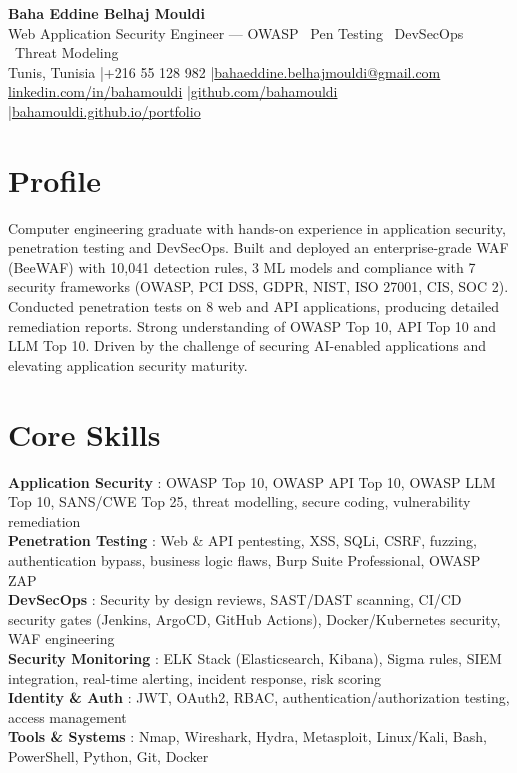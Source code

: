 \documentclass[a4paper,9pt]{article}
\begin{document}
\begin{center}
{\LARGE\bfseries\color{navy} Baha Eddine Belhaj Mouldi}\\[2pt]
{\normalsize\color{navy} Web Application Security Engineer --- OWASP \textbar\ Pen Testing \textbar\ DevSecOps \textbar\ Threat Modeling}\\[3pt]
{\small Tunis, Tunisia \quad|\quad +216 55 128 982 \quad|\quad \href{mailto:bahaeddine.belhajmouldi@gmail.com}{bahaeddine.belhajmouldi@gmail.com}}\\[1pt]
{\small \href{https://www.linkedin.com/in/bahamouldi}{linkedin.com/in/bahamouldi} \quad|\quad \href{https://github.com/bahamouldi}{github.com/bahamouldi} \quad|\quad \href{https://bahamouldi.github.io/portfolio/}{bahamouldi.github.io/portfolio}}
\end{center}
\vspace{1pt}
\section{Profile}
Computer engineering graduate with hands-on experience in application security, penetration testing and DevSecOps. Built and deployed an enterprise-grade WAF (BeeWAF) with 10,041 detection rules, 3 ML models and compliance with 7 security frameworks (OWASP, PCI DSS, GDPR, NIST, ISO 27001, CIS, SOC 2). Conducted penetration tests on 8 web and API applications, producing detailed remediation reports. Strong understanding of OWASP Top 10, API Top 10 and LLM Top 10. Driven by the challenge of securing AI-enabled applications and elevating application security maturity.
\section{Core Skills}
\textbf{Application Security} : OWASP Top 10, OWASP API Top 10, OWASP LLM Top 10, SANS/CWE Top 25, threat modelling, secure coding, vulnerability remediation\\[0.3pt]
\textbf{Penetration Testing} : Web \& API pentesting, XSS, SQLi, CSRF, fuzzing, authentication bypass, business logic flaws, Burp Suite Professional, OWASP ZAP\\[0.3pt]
\textbf{DevSecOps} : Security by design reviews, SAST/DAST scanning, CI/CD security gates (Jenkins, ArgoCD, GitHub Actions), Docker/Kubernetes security, WAF engineering\\[0.3pt]
\textbf{Security Monitoring} : ELK Stack (Elasticsearch, Kibana), Sigma rules, SIEM integration, real-time alerting, incident response, risk scoring\\[0.3pt]
\textbf{Identity \& Auth} : JWT, OAuth2, RBAC, authentication/authorization testing, access management\\[0.3pt]
\textbf{Tools \& Systems} : Nmap, Wireshark, Hydra, Metasploit, Linux/Kali, Bash, PowerShell, Python, Git, Docker
\end{document}
